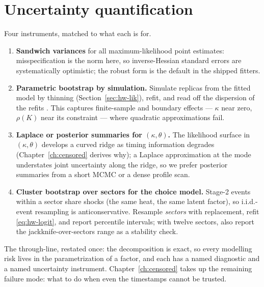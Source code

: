 \section{Uncertainty quantification}
\label{sec:hw-uq}

Four instruments, matched to what each is for.
\begin{enumerate}
\item \textbf{Sandwich variances} for all maximum-likelihood point estimates:
misspecification is the norm here, so inverse-Hessian standard errors are systematically
optimistic; the robust form is the default in the shipped fitters.
\item \textbf{Parametric bootstrap by simulation.} Simulate replicas from the fitted model
by thinning (Section~\ref{sec:hw-lik}), refit, and read off the dispersion of the refits
\cite{efron1994}. This captures finite-sample and boundary effects --- $\kappa$ near zero,
$\rho(K)$ near its constraint --- where quadratic approximations fail.
\item \textbf{Laplace or posterior summaries for $(\kappa, \theta)$.} The
likelihood surface in $(\kappa,\theta)$ develops a curved ridge as timing information
degrades (Chapter~\ref{ch:censored} derives why); a Laplace approximation at the mode
understates joint uncertainty along the ridge, so we prefer posterior summaries from a
short MCMC or a dense profile scan.
\item \textbf{Cluster bootstrap over sectors for the choice model.} Stage-2 events within
a sector share shocks (the same heat, the same latent factor), so i.i.d.-event resampling
is anticonservative. Resample \emph{sectors} with replacement, refit
\eqref{eq:hw-logit}, and report percentile intervals; with twelve sectors, also report
the jackknife-over-sectors range as a stability check.
\end{enumerate}

The through-line, restated once: the decomposition is exact, so every modelling risk
lives in the parametrization of a factor, and each has a named diagnostic and a named
uncertainty instrument. Chapter~\ref{ch:censored} takes up the remaining failure mode:
what to do when even the timestamps cannot be trusted.
